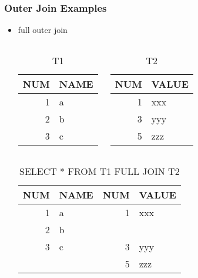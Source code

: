 \documentclass[dvipsnames]{beamer}
\theoremstyle{plain}
\begin{document}
\begin{frame}[fragile]
  \frametitle{Outer Join Examples}

  \begin{itemize}
    \item full outer join
    \begin{columns}[t]
      \begin{tiny}
      \begin{table}
        \caption{T1}
        \begin{tabular}{|r|l|}\hline
NUM & NAME \\\hline\hline
  1 & a    \\\hline
  2 & b    \\\hline
  3 & c    \\\hline
        \end{tabular}
      \end{table}
      \end{tiny}

      \begin{tiny}
      \begin{table}
        \caption{T2}
        \begin{tabular}{|r|l|}\hline
NUM & VALUE \\\hline\hline
  1 & xxx   \\\hline
  3 & yyy   \\\hline
  5 & zzz   \\\hline
        \end{tabular}
      \end{table}
      \end{tiny}
    \end{columns}

    \pause
    \begin{center}
      \begin{tiny}
      \begin{table}
        \caption{SELECT * FROM T1 FULL JOIN T2}
        \begin{tabular}{|r|l|r|l|}\hline
NUM & NAME & NUM & VALUE \\\hline\hline
  1 & a    &   1 & xxx   \\\hline
  2 & b    &     &       \\\hline
  3 & c    &   3 & yyy   \\\hline
    &      &   5 & zzz   \\\hline
        \end{tabular}
      \end{table}
      \end{tiny}
    \end{center}
  \end{itemize}
\end{frame}
\end{document}
